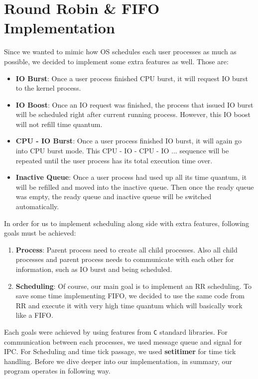 \documentclass{homework}
\begin{document}
\section{Round Robin & FIFO Implementation} 
Since we wanted to mimic how OS schedules each user processes as much as possible, we decided to implement some extra features as well. Those are:
\begin{itemize}
    \item \textbf{IO Burst}: Once a user process finished CPU burst, it will request IO burst to the kernel process.
    \item \textbf{IO Boost}: Once an IO request was finished, the process that issued IO burst will be scheduled right after current running process. However, this IO boost will not refill time quantum.
    \item \textbf{CPU - IO Burst}: Once a user process finished IO burst, it will again go into CPU burst mode. This CPU - IO - CPU - IO ... sequence will be repeated until the user process has its total execution time over.
    \item \textbf{Inactive Queue}: Once a user process had used up all its time quantum, it will be refilled and moved into the inactive queue. Then once the ready queue was empty, the ready queue and inactive queue will be switched automatically.
\end{itemize}
In order for us to implement scheduling along side with extra features, following goals must be achieved:
\begin{enumerate}
    \item \textbf{Process}: Parent process need to create all child processes. Also all child processes and parent process needs to communicate with each other for information, such as IO burst and being scheduled.
    \item \textbf{Scheduling}: Of course, our main goal is to implement an RR scheduling. To save some time implementing FIFO, we decided to use the same code from RR and execute it with very high time quantum which will basically work like a FIFO.
\end{enumerate}
Each goals were achieved by using features from \texttt{C} standard libraries. For communication between each processes, we used message queue and signal for IPC. For Scheduling and time tick passage, we used \textbf{setitimer} for time tick handling. Before we dive deeper into our implementation, in summary, our program operates in following way.
\end{document}
